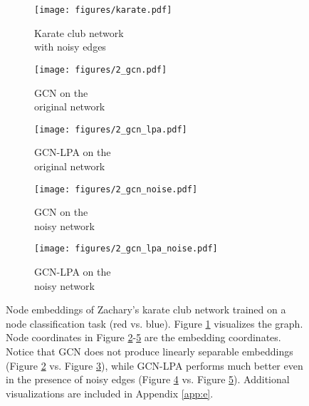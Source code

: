 \documentclass{article}
\begin{document}
		\begin{figure*}
			\centering
			\captionsetup[subfigure]{justification=centering}
			\begin{subfigure}[b]{0.215\textwidth}
   				\texttt{[image: figures/karate.pdf]}
   				\caption{Karate club network\\with noisy edges}
   				\label{fig:karate_1}
			\end{subfigure}
			\hfill
			\begin{subfigure}[b]{0.19\textwidth}
   				\texttt{[image: figures/2\_gcn.pdf]}
   				\caption{GCN on the\\original network}
   				\label{fig:karate_2}
			\end{subfigure}
			\hfill
			\begin{subfigure}[b]{0.19\textwidth}
				\texttt{[image: figures/2\_gcn\_lpa.pdf]}
				\caption{GCN-LPA on the\\original network}
				\label{fig:karate_3}
			\end{subfigure}
			\hfill
			\begin{subfigure}[b]{0.19\textwidth}
   				\texttt{[image: figures/2\_gcn\_noise.pdf]}
   				\caption{GCN on the\\noisy network}
   				\label{fig:karate_4}
			\end{subfigure}
			\hfill
			\begin{subfigure}[b]{0.19\textwidth}
				\texttt{[image: figures/2\_gcn\_lpa\_noise.pdf]}
				\caption{GCN-LPA on the\\noisy network}
				\label{fig:karate_5}
			\end{subfigure}
			\caption{Node embeddings of Zachary's karate club network trained on a node classification task (red vs. blue). Figure \ref{fig:karate_1} visualizes the graph. Node coordinates in Figure \ref{fig:karate_2}-\ref{fig:karate_5} are the embedding coordinates. Notice that GCN does not produce linearly separable embeddings (Figure \ref{fig:karate_2} vs. Figure \ref{fig:karate_3}), while GCN-LPA performs much better even in the presence of noisy edges (Figure \ref{fig:karate_4} vs. Figure \ref{fig:karate_5}).
Additional visualizations are included in Appendix \ref{app:e}.}
			\label{fig:karate}
		\end{figure*}
		
\end{document}
